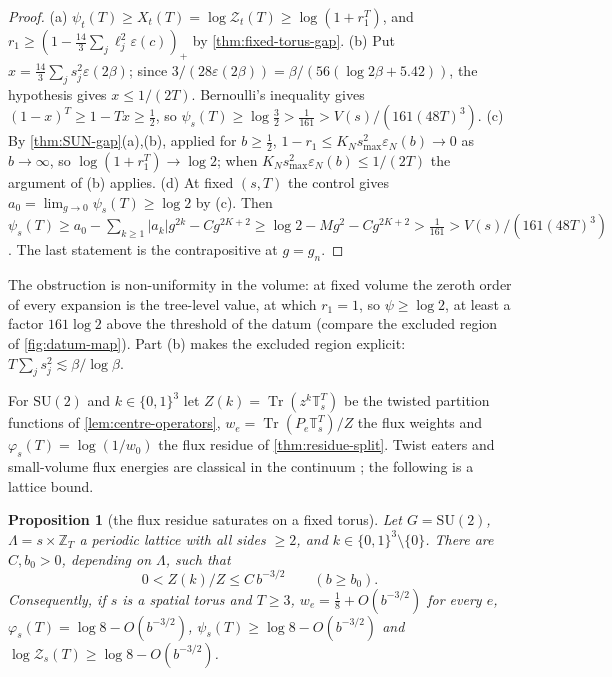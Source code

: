 \documentclass[11pt,a4paper]{amsart}
\newtheorem{proposition}[theorem]{Proposition}
\theoremstyle{definition}
\theoremstyle{remark}
\numberwithin{equation}{section}
\DeclareMathOperator{\Tr}{Tr}        %
\newcommand{\Z}{\mathbb{Z}}          %
\newcommand{\abs}[1]{\lvert #1\rvert}      %
\newcommand{\SU}{\mathrm{SU}}              %
\newcommand{\TT}{\mathbb{T}}               %
\newcommand{\Zc}{\mathcal{Z}}              %
\newcommand{\Zs}[2]{\Zc_{#1}(#2)}          %
\newcommand{\XT}[2]{X_{#1}(#2)}            %
\newcommand{\psiT}[2]{\psi_{#1}(#2)}       %
\newcommand{\Vol}[1]{V(#1)}                %
\begin{document}
\begin{proof}
(a) $\psiT{t}{T}\ge\XT{t}{T}=\log\Zs{t}{T}\ge\log(1+r_1^T)$, and $r_1\ge(1-\frac{14}3\sum_j\ell_j^2\varepsilon(c))_+$ by \cref{thm:fixed-torus-gap}. (b) Put $x=\frac{14}3\sum_js_j^2\varepsilon(2\beta)$; since $3/(28\varepsilon(2\beta))=\beta/(56(\log2\beta+5.42))$, the hypothesis gives $x\le1/(2T)$. Bernoulli's inequality gives $(1-x)^T\ge1-Tx\ge\frac12$, so $\psiT{s}{T}\ge\log\frac32>\frac1{161}>\Vol s/(161(48T)^3)$. (c) By \cref{thm:SUN-gap}(a),(b), applied for $b\ge\frac12$, $1-r_1\le K_Ns_{\max}^2\varepsilon_N(b)\to0$ as $b\to\infty$, so $\log(1+r_1^T)\to\log2$; when $K_Ns_{\max}^2\varepsilon_N(b)\le1/(2T)$ the argument of (b) applies. (d) At fixed $(s,T)$ the control gives $a_0=\lim_{g\to0}\psiT{s}{T}\ge\log2$ by (c). Then $\psiT{s}{T}\ge a_0-\sum_{k\ge1}\abs{a_k}g^{2k}-Cg^{2K+2}\ge\log2-Mg^2-Cg^{2K+2}>\frac1{161}>\Vol s/(161(48T)^3)$. The last statement is the contrapositive at $g=g_n$.
\end{proof}

The obstruction is non-uniformity in the volume: at fixed volume the zeroth order of every expansion is the tree-level value, at which $r_1=1$, so $\psi\ge\log2$, at least a factor $161\log2$ above the threshold of the datum (compare the excluded region of \cref{fig:datum-map}). Part (b) makes the excluded region explicit: $T\sum_js_j^2\lesssim\beta/\log\beta$.

For $\SU(2)$ and $k\in\{0,1\}^3$ let $Z(k)=\Tr(z^k\TT_s^T)$ be the twisted partition functions of \cref{lem:centre-operators}, $w_e=\Tr(P_e\TT_s^T)/Z$ the flux weights and $\varphi_s(T)=\log(1/w_0)$ the flux residue of \cref{thm:residue-split}. Twist eaters and small-volume flux energies are classical in the continuum \cite{thooft1979,thooft1981,koller1987,luscher1983}; the following is a lattice bound.

\begin{proposition}[the flux residue saturates on a fixed torus]\label{prop:flux-saturation}
Let $G=\SU(2)$, $\Lambda=s\times\Z_T$ a periodic lattice with all sides $\ge2$, and $k\in\{0,1\}^3\setminus\{0\}$. There are $C,b_0>0$, depending on $\Lambda$, such that
\[
0<Z(k)/Z\le C\,b^{-3/2}\qquad(b\ge b_0).
\]
Consequently, if $s$ is a spatial torus and $T\ge3$, $w_e=\frac18+O(b^{-3/2})$ for every $e$, $\varphi_s(T)=\log8-O(b^{-3/2})$, $\psiT{s}{T}\ge\log8-O(b^{-3/2})$ and $\log\Zs{s}{T}\ge\log8-O(b^{-3/2})$.
\end{proposition}
\end{document}
